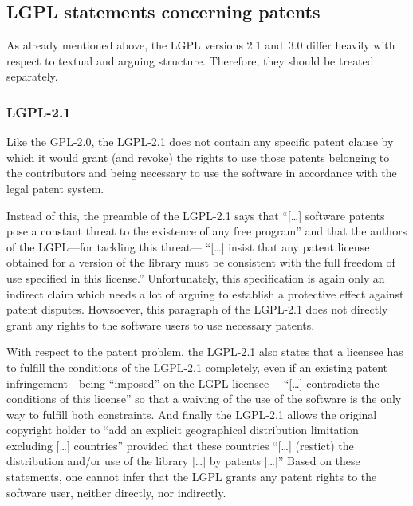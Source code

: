\subsection{LGPL statements concerning patents}

As already mentioned above, the LGPL versions 2.1 and~3.0 differ heavily with
respect to textual and arguing structure. Therefore, they should be treated
separately.

\subsubsection{LGPL-2.1}\label{subsec:Lgpl21PatentClause}

Like the GPL-2.0, the LGPL-2.1 does not contain any specific patent clause by
which it would grant (and revoke) the rights to use those patents belonging to
the contributors and being necessary to use the software in accordance with the
legal patent system.

Instead of this, the preamble of the LGPL-2.1 says that \enquote{[\ldots]
software patents pose a constant threat to the existence of any free program}
and that the authors of the LGPL---for tackling this threat---%
\enquote{[\ldots] insist that any patent license obtained for a version of the
library must be consistent with the full freedom of use specified in this
license.}
Unfortunately, this specification is again only an indirect claim which needs a
lot of arguing to establish a protective effect against patent disputes.
Howsoever, this paragraph of the LGPL-2.1 does not directly grant any rights to
the software users to use necessary patents.

With respect to the patent problem, the LGPL-2.1 also states that a licensee has
to fulfill the conditions of the LGPL-2.1 completely, even if an existing patent
infringement---being \enquote{imposed} on the LGPL licensee---%
\enquote{[\ldots] contradicts the conditions of this license} so that a waiving
of the use of the software is the only way to fulfill both
constraints. And finally the LGPL-2.1 allows the original
copyright holder to \enquote{add an explicit geographical distribution limitation
excluding [\ldots] countries} provided that these countries \enquote{[\ldots]
(restict) the distribution and/or use of the library [\ldots] by patents
[\ldots]} Based on these statements, one cannot infer that 
the LGPL grants any patent rights to the software user, neither directly, nor
indirectly.

